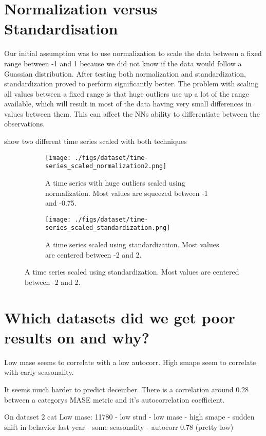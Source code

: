 \section{Normalization versus Standardisation}
Our initial assumption was to use normalization to scale the data between a
fixed range between -1 and 1 because we did not know if the data would follow a Guassian
distribution. After testing both normalization and standardization,
standardization proved to perform significantly better.
The problem with scaling all values between a fixed range is that huge
outliers use up a lot of the range available, which will result in
most of the data having very small differences in values between them.
This can affect the NNs ability to differentiate between the observations.

 show two different time series
scaled with both techniques
\begin{figure}[h!]
  \centering
  \caption{Effects of different scaling techniques on a dataset with huge outliers.}
  \label{fig:time-series-standardization-vs-normalization}
  \begin{subfigure}[b]{0.49\textwidth}
    \texttt{[image: ./figs/dataset/time-series\_scaled\_normalization2.png]}
    \hfill
    \caption{A time series with huge outliers scaled using normalization. Most values are squeezed between -1 and -0.75.}
    \label{fig:time-series-normalization}
  \end{subfigure}
  \begin{subfigure}[b]{0.49\textwidth}
    \texttt{[image: ./figs/dataset/time-series\_scaled\_standardization.png]}
    \hfill
    \caption{A time series scaled using standardization. Most values are centered between -2 and 2.}
    \label{fig:time-series-standardization}
  \end{subfigure}
\end{figure}

\section{Which datasets did we get poor results on and why?}
Low mase seems to correlate with a low autocorr.
High smape seem to correlate with early seasonality.

It seems much harder to predict december.
There is a correlation around 0.28 between a categorys MASE metric
and it's autocorrelation coefficient.

\iffalse
  On dataset 2 cat
  Low mase:
  11780
  - low stnd
  - low mase
  - high smape
  - sudden shift in behavior last year
  - some seasonality
  - autocorr 0.78 (pretty low)


